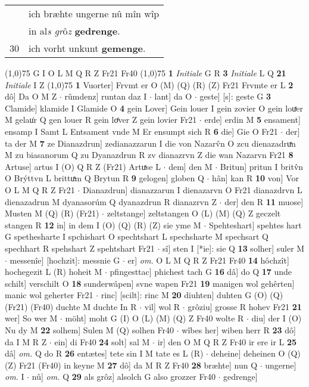 \documentclass[8pt,a4paper,notitlepage]{article}
\begin{document}
\begin{table}[ht]
\begin{minipage}[t]{0.5\linewidth}
\begin{tabular}{rl}
 & ich bræhte ungerne nû mîn wîp\\ 
 & in al\textit{s gr}ô\textit{z} \textbf{gedrenge}.\\ 
30 & ich vorht unkunt \textbf{gemenge}.\\ 
\end{tabular}
\scriptsize
\line(1,0){75} \newline
G I O L M Q R Z Fr21 Fr40 \newline
\line(1,0){75} \newline
\textbf{1} \textit{Initiale} G R  \textbf{3} \textit{Initiale} L Q  \textbf{21} \textit{Initiale} I Z  \newline
\line(1,0){75} \newline
\textbf{1} Vuorter] Frvmt er O (M) (Q) (R) (Z) Fr21 Frvmte er L \textbf{2} dô] Da O M Z  $\cdot$ rûmdenz] runtan daz I  $\cdot$ lant] da O  $\cdot$ geste] [s]: geste G \textbf{3} Clamide] klamide I Glamide O \textbf{4} gein Lover] Gein louer I gein zovier O gein louͯer M gelau͑r Q gen louer R gein loͤver Z gein lovier Fr21  $\cdot$ erde] erdin M \textbf{5} ensament] ensamp I Samt L Entsament vnde M Er ensumpt sich R \textbf{6} die] Gie O Fr21  $\cdot$ der] ta der M \textbf{7} ze Dianazdrun] zedianazzarun I die von Nazarv̂n O zcu dienazadruͯn M zu biasanorum Q zu Dyanazdrun R zv dianazrvn Z die wan Nazarvn Fr21 \textbf{8} Artuse] artus I (O) Q R Z (Fr21) Artuͯse L  $\cdot$ dem] den M  $\cdot$ Britun] pritun I britv̂n O Brýttvn L brittuͯm Q Brytun R \textbf{9} gelogen] globen Q  $\cdot$ hân] kan R \textbf{10} von] Vor O L M Q R Z Fr21  $\cdot$ Dianazdrun] dianazzarun I dienazarvn O Fr21 dianazdrvn L dienazadrun M dyanasorúm Q dyanazdrun R dianazrvn Z  $\cdot$ der] den R \textbf{11} muose] Musten M (Q) (R) (Fr21)  $\cdot$ zeltstange] zeltstangen O (L) (M) (Q) Z geczelt stangen R \textbf{12} in] in dem I (O) (Q) (R) (Z) sie yme M  $\cdot$ Spehteshart] spehtes hart G spethesharte I spchishart O spechtshart L spechsharte M spechsart Q spechhart R spehshart Z spehtshart Fr21  $\cdot$ sî] sten I [*ie]: sie Q \textbf{13} solher] suler M  $\cdot$ messenîe] [hochzit]: messnie G  $\cdot$ er] \textit{om.} O L M Q R Z Fr21 Fr40 \textbf{14} hôchzît] hochegezit L (R) hoheit M  $\cdot$ pfingesttac] phichest tach G \textbf{16} dâ] do Q \textbf{17} unde schilt] verschilt O \textbf{18} sunderwâpen] svne wapen Fr21 \textbf{19} manigen wol gehêrten] manic wol geherter Fr21  $\cdot$ rinc] [scilt]: rinc M \textbf{20} diuhten] duhten G (O) (Q) (Fr21) (Fr40) duchte M duchte In R  $\cdot$ vil] wol R  $\cdot$ grôziu] grosse R hohev Fr21 \textbf{21} wer] So wer M  $\cdot$ möht] moht G (I) O (L) (M) (Q) Z Fr40 wolte R  $\cdot$ diu] der I (O) Nu dy M \textbf{22} solhem] Sulen M (Q) solhen Fr40  $\cdot$ wîbes her] wiben herr R \textbf{23} dô] da I M R Z  $\cdot$ ein] di Fr40 \textbf{24} solt] sal M  $\cdot$ ir] den O M Q R Z Fr40 ir ere ir L \textbf{25} dâ] \textit{om.} Q do R \textbf{26} entætes] tete sin I M tate es L (R)  $\cdot$ deheine] deheinen O (Q) (Z) Fr21 (Fr40) in keyne M \textbf{27} dô] da M R Z Fr40 \textbf{28} bræhte] nun Q  $\cdot$ ungerne] \textit{om.} I  $\cdot$ nû] \textit{om.} Q \textbf{29} als grôz] alsolch G also grozzer Fr40  $\cdot$ gedrenge] 
\end{minipage}
\end{table}
\end{document}
